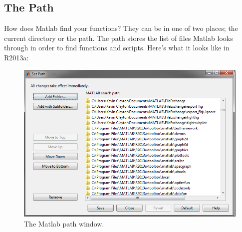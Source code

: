 \begin{quote}

\end{quote}

\pagebreak
\subsection{The Path}
How does Matlab find your functions?
 They can be in one of two places; the current directory or the path.
 The path stores the list of files Matlab looks through in order to find functions and scripts.
 Here's what it looks like in R2013a:

\begin{figure}[ht!]
\centering
\includegraphics[width=120mm]{img/path.png}
\caption{The Matlab path window.}
\label{overflow}
\end{figure}